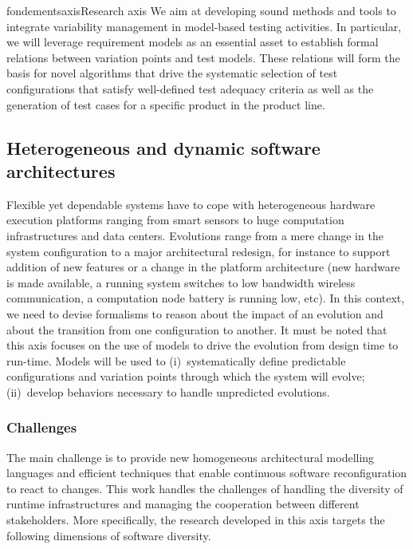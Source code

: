 \documentclass{ra2018}
\begin{document}
\begin{module}{fondements}{axis}{Research axis}
We aim at developing sound methods and tools to integrate variability management in model-based testing activities. In particular, we will leverage requirement models as an essential asset to establish formal relations between variation points and test models. These relations will form the basis for novel algorithms that drive  the systematic selection of test configurations that satisfy well-defined test adequacy criteria as well as the generation of test cases for a specific product in the product line.




\subsection{Heterogeneous and dynamic software architectures}
\label{sec:axis-runtime}



Flexible yet dependable systems have to cope with heterogeneous hardware execution platforms ranging from smart sensors to huge computation infrastructures and data centers. Evolutions range from a mere change in the system configuration to a major architectural redesign,  for instance to support addition of new features or a change in the platform architecture (new hardware is made available, a running system switches to low bandwidth wireless communication, a computation node battery is running low, etc).
In this context, we need to devise formalisms to reason about the impact of an evolution and about the transition from one configuration to another.
It must be noted that this axis focuses on the use of models to drive the evolution from design time to run-time. 
Models will be used to (i)~systematically define predictable configurations and variation points through which the system will evolve;
(ii)~develop behaviors necessary to handle unpredicted evolutions.

\subsubsection*{Challenges} 

The main challenge is to provide new homogeneous architectural modelling languages and efficient techniques that enable continuous software reconfiguration to react to changes. This work handles the challenges of handling the diversity of runtime infrastructures and managing the cooperation between different stakeholders. More specifically, the research developed in this axis targets the following dimensions of software diversity.


\end{module}
\end{document}
